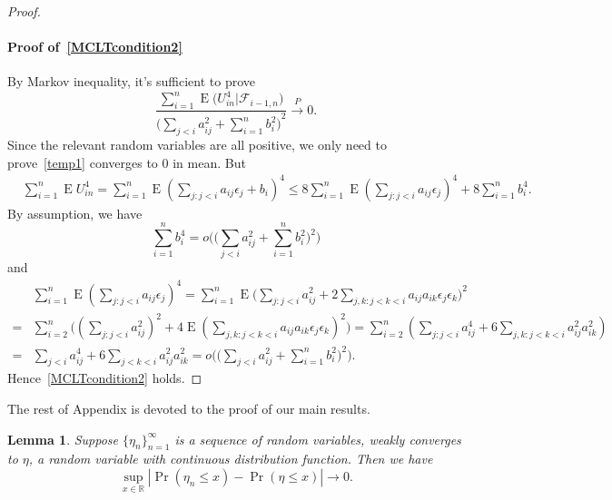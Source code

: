 \documentclass[review]{elsarticle}
\DeclareMathOperator{\myE}{E}
\theoremstyle{plain}
\newtheorem{lemma}{Lemma}
\theoremstyle{definition}
\theoremstyle{remark}
\begin{document}
\begin{proof}
     \paragraph{Proof of~\eqref{MCLTcondition2}}
     By Markov inequality, it's sufficient to prove
     \begin{equation}\label{temp1}
         \frac{\sum_{i=1}^n \myE\big(U_{in}^4\big|\mathcal{F}_{i-1,n}\big)}{{\big(\sum_{j<i} a_{ij}^2+\sum_{i=1}^n b_i^2\big)}^2}\xrightarrow{P} 0.
     \end{equation}
     Since the relevant random variables are all positive, we only need to prove~\eqref{temp1} converges to $0$ in mean. But
     \begin{equation*}
         \begin{aligned}
             &\sum_{i=1}^n \myE U_{in}^4
             =
             \sum_{i=1}^n \myE (\sum_{j:j<i}a_{ij}\epsilon_j+b_i)^4
             \leq
             8\sum_{i=1}^n \myE (\sum_{j:j<i}a_{ij}\epsilon_j)^4
             +8\sum_{i=1}^n b_i^4.
         \end{aligned}
     \end{equation*}
     By assumption, we have
     $$
     \sum_{i=1}^n b_i^4=
             o\Big(\big(\sum_{j<i} a_{ij}^2 +\sum_{i=1}^n b_i^2\big)^2\Big)
     $$
     and
     \begin{equation*}
         \begin{aligned}
             &\sum_{i=1}^n \myE (\sum_{j:j<i}a_{ij}\epsilon_j)^4=
             \sum_{i=1}^n \myE \big(\sum_{j:j<i}a_{ij}^2+2\sum_{j,k:j<k<i}a_{ij}a_{ik}\epsilon_j \epsilon_k \big)^2\\
             =&
             \sum_{i=2}^n  \big({(\sum_{j:j<i}a_{ij}^2)}^2+4\myE{(\sum_{j,k:j<k<i}a_{ij}a_{ik}\epsilon_j \epsilon_k)}^2 \big)
             =
             \sum_{i=2}^n  (\sum_{j:j<i}a_{ij}^4+6\sum_{j,k:j<k<i}a_{ij}^2 a_{ik}^2)\\
             =&
             \sum_{j<i}a_{ij}^4+6\sum_{j<k<i}a_{ij}^2 a_{ik}^2
             =
             o\Big(\big(\sum_{j<i} a_{ij}^2 +\sum_{i=1}^n b_i^2\big)^2\Big).
         \end{aligned}
     \end{equation*}
      Hence~\eqref{MCLTcondition2} holds.
 \end{proof}

The rest of Appendix is devoted to the proof of our main results.
\begin{lemma}\label{lemmaUniformSimple}
    Suppose $\{\eta_n\}_{n=1}^{\infty}$ is a sequence of random variables, weakly converges to $\eta$, a random variable with continuous distribution function.
    Then we have
    \begin{equation*}
        \sup_{x\in\mathbb{R}}|\Pr(\eta_n\leq x)-\Pr(\eta\leq x)|\to 0.
    \end{equation*}
\end{lemma}
\end{document}
